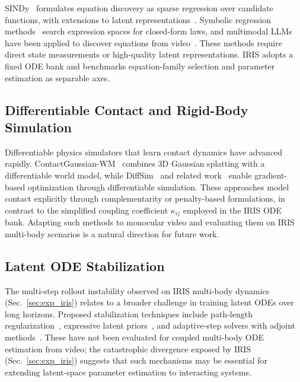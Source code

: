 \documentclass[runningheads]{llncs}
\begin{document}
SINDy~\cite{brunton2016discovering} formulates equation discovery as sparse regression over candidate functions, with extensions to latent representations~\cite{champion2019data}. Symbolic regression methods~\cite{Schmidt2009DistillingFN} search expression spaces for closed-form laws, and multimodal LLMs have been applied to discover equations from video~\cite{li2025mllmbaseddiscoveryintrinsiccoordinates}. These methods require direct state measurements or high-quality latent representations. IRIS adopts a fixed ODE bank and benchmarks equation-family selection and parameter estimation as separable axes.

\subsection{Differentiable Contact and Rigid-Body Simulation}
\label{sec:related_contact}

Differentiable physics simulators that learn contact dynamics have advanced rapidly. ContactGaussian-WM~\cite{wang2026contact} combines 3D Gaussian splatting with a differentiable world model, while DiffSim~\cite{song2024diffsim} and related work~\cite{degrave2018differentiable, werling2021fastfeature} enable gradient-based optimization through differentiable simulation. These approaches model contact explicitly through complementarity or penalty-based formulations, in contrast to the simplified coupling coefficient $\kappa_{ij}$ employed in the IRIS ODE bank. Adapting such methods to monocular video and evaluating them on IRIS multi-body scenarios is a natural direction for future work.

\subsection{Latent ODE Stabilization}
\label{sec:related_stabilization}

The multi-step rollout instability observed on IRIS multi-body dynamics (Sec.~\ref{sec:exp_iris}) relates to a broader challenge in training latent ODEs over long horizons. Proposed stabilization techniques include path-length regularization~\cite{finlay2020trainneuralodeworld}, expressive latent priors~\cite{wang2021learningsolutionoperatorparametric}, and adaptive-step solvers with adjoint methods~\cite{chen2018neural}. These have not been evaluated for coupled multi-body ODE estimation from video; the catastrophic divergence exposed by IRIS (Sec.~\ref{sec:exp_iris}) suggests that such mechanisms may be essential for extending latent-space parameter estimation to interacting systems.
\end{document}
